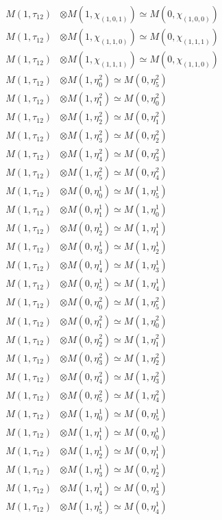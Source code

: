 \begin{align*}
M(1,\tau_{12}) &\otimes M(1,\chi_{(1,0,1)}) \simeq M(0,\chi_{(1,0,0)}) \\
M(1,\tau_{12}) &\otimes M(1,\chi_{(1,1,0)}) \simeq M(0,\chi_{(1,1,1)}) \\
M(1,\tau_{12}) &\otimes M(1,\chi_{(1,1,1)}) \simeq M(0,\chi_{(1,1,0)}) \\
M(1,\tau_{12}) &\otimes M(1,\eta^{2}_{0}) \simeq M(0,\eta^{2}_{5}) \\
M(1,\tau_{12}) &\otimes M(1,\eta^{2}_{1}) \simeq M(0,\eta^{2}_{0}) \\
M(1,\tau_{12}) &\otimes M(1,\eta^{2}_{2}) \simeq M(0,\eta^{2}_{1}) \\
M(1,\tau_{12}) &\otimes M(1,\eta^{2}_{3}) \simeq M(0,\eta^{2}_{2}) \\
M(1,\tau_{12}) &\otimes M(1,\eta^{2}_{4}) \simeq M(0,\eta^{2}_{3}) \\
M(1,\tau_{12}) &\otimes M(1,\eta^{2}_{5}) \simeq M(0,\eta^{2}_{4}) \\
M(1,\tau_{12}) &\otimes M(0,\eta^{1}_{0}) \simeq M(1,\eta^{1}_{5}) \\
M(1,\tau_{12}) &\otimes M(0,\eta^{1}_{1}) \simeq M(1,\eta^{1}_{0}) \\
M(1,\tau_{12}) &\otimes M(0,\eta^{1}_{2}) \simeq M(1,\eta^{1}_{1}) \\
M(1,\tau_{12}) &\otimes M(0,\eta^{1}_{3}) \simeq M(1,\eta^{1}_{2}) \\
M(1,\tau_{12}) &\otimes M(0,\eta^{1}_{4}) \simeq M(1,\eta^{1}_{3}) \\
M(1,\tau_{12}) &\otimes M(0,\eta^{1}_{5}) \simeq M(1,\eta^{1}_{4}) \\
M(1,\tau_{12}) &\otimes M(0,\eta^{2}_{0}) \simeq M(1,\eta^{2}_{5}) \\
M(1,\tau_{12}) &\otimes M(0,\eta^{2}_{1}) \simeq M(1,\eta^{2}_{0}) \\
M(1,\tau_{12}) &\otimes M(0,\eta^{2}_{2}) \simeq M(1,\eta^{2}_{1}) \\
M(1,\tau_{12}) &\otimes M(0,\eta^{2}_{3}) \simeq M(1,\eta^{2}_{2}) \\
M(1,\tau_{12}) &\otimes M(0,\eta^{2}_{4}) \simeq M(1,\eta^{2}_{3}) \\
M(1,\tau_{12}) &\otimes M(0,\eta^{2}_{5}) \simeq M(1,\eta^{2}_{4}) \\
M(1,\tau_{12}) &\otimes M(1,\eta^{1}_{0}) \simeq M(0,\eta^{1}_{5}) \\
M(1,\tau_{12}) &\otimes M(1,\eta^{1}_{1}) \simeq M(0,\eta^{1}_{0}) \\
M(1,\tau_{12}) &\otimes M(1,\eta^{1}_{2}) \simeq M(0,\eta^{1}_{1}) \\
M(1,\tau_{12}) &\otimes M(1,\eta^{1}_{3}) \simeq M(0,\eta^{1}_{2}) \\
M(1,\tau_{12}) &\otimes M(1,\eta^{1}_{4}) \simeq M(0,\eta^{1}_{3}) \\
M(1,\tau_{12}) &\otimes M(1,\eta^{1}_{5}) \simeq M(0,\eta^{1}_{4}) \\
\end{align*}

